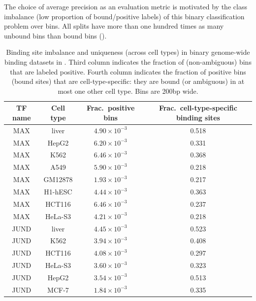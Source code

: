 The choice of average precision as an evaluation metric is motivated by the class imbalance (low proportion of bound/positive labels) of this binary classification problem over bins.
All splits have more than one hundred times as many unbound bins than bound bins ().



\begin{table}[t]
  \caption{Binding site imbalance and uniqueness (across cell types) in binary genome-wide binding datasets in \Encode.
  Third column indicates the fraction of (non-ambiguous) bins that are labeled positive.
  Fourth column indicates the fraction of positive bins (bound sites) that are cell-type-specific: they are bound (or ambiguous) in at most one other cell type.
  Bins are 200bp wide.
  }
  \label{tab:label_imbalance}
  \begin{center}
  \begin{small}
  \begin{tabular}{cccc}
  \toprule
  TF name & Cell type &  Frac.~positive bins  &  Frac.~cell-type-specific binding sites \\
  \midrule
  MAX  &  liver  & $4.90 \times 10^{-3}$ &  0.518 \\
  MAX  &  HepG2  & $6.20 \times 10^{-3}$ &  0.331 \\
  MAX  &  K562  & $6.46 \times 10^{-3}$ &  0.368 \\
  MAX  &  A549  & $5.90 \times 10^{-3}$ &  0.218 \\
  MAX  &  GM12878  & $1.93 \times 10^{-3}$ &  0.217 \\
  MAX  &  H1-hESC  & $4.44 \times 10^{-3}$ &  0.363 \\
  MAX  &  HCT116  & $6.46 \times 10^{-3}$ &  0.237 \\
  MAX  &  HeLa-S3  & $4.21 \times 10^{-3}$ &  0.218 \\
  \midrule
  JUND  &  liver  & $4.45 \times 10^{-3}$ &  0.523 \\
  JUND  &  K562  & $3.94 \times 10^{-3}$ &  0.408 \\
  JUND  &  HCT116  & $4.08 \times 10^{-3}$ &  0.297 \\
  JUND  &  HeLa-S3  &  $3.60 \times 10^{-3}$ &  0.323 \\
  JUND  &  HepG2  & $3.54 \times 10^{-3}$ &  0.513 \\
  JUND  &  MCF-7  &  $1.84 \times 10^{-3}$  &  0.335 \\
  \bottomrule
  \end{tabular}
  \end{small}
  \end{center}
  \vspace{-4mm}
\end{table}


